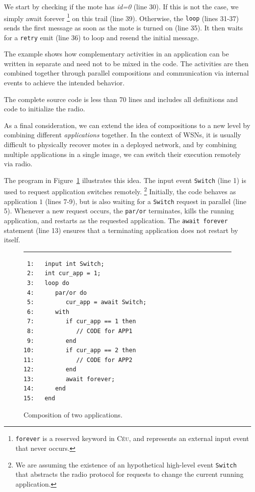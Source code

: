 \documentclass{sigplan-proc}
\newcommand{\2}{\;\;}
\newcommand{\5}{\;\;\;\;\;}
\newcommand{\CEU}{\textsc{C\'{e}u}}
\newcommand{\code}[1] {{\small{\texttt{#1}}}}
\begin{document}
We start by checking if the mote has \emph{id=0} (line 30).
If this is not the case, we simply await forever%
\footnote{\code{forever} is a reserved keyword in \CEU, and represents an 
external input event that never occurs.}
on this trail (line 39).
Otherwise, the \code{loop} (lines 31-37) sends the first message as soon as the 
mote is turned on (line 35).
It then waits for a \code{retry} emit (line 36) to loop and resend the initial 
message.

The example shows how complementary activities in an application can be written 
in separate and need not to be mixed in the code.
The activities are then combined together through parallel compositions and 
communication via internal events to achieve the intended behavior.

The complete source code is less than 70 lines and includes all definitions and 
code to initialize the radio.

As a final consideration, we can extend the idea of compositions to a new level 
by combining different \emph{applications} together.
In the context of WSNs, it is usually difficult to physically recover motes in 
a deployed network, and by combining multiple applications in a single image, 
we can switch their execution remotely via radio.

The program in Figure~\ref{lst:demos:ring:4} illustrates this idea.
The input event \code{Switch} (line 1) is used to request application switches 
remotely.%
\footnote{ We are assuming the existence of an hypothetical high-level event 
\code{Switch} that abstracts the radio protocol for requests to change the 
current running application. }
Initially, the code behaves as application $1$ (lines 7-9), but is also waiting 
for a \code{Switch} request in parallel (line 5).
Whenever a new request occurs, the \code{par/or} terminates, kills the running 
application, and restarts as the requested application.
The \code{await forever} statement (line 13) ensures that a terminating 
application does not restart by itself.

\begin{figure}[t]
\rule{8.5cm}{0.37pt}
{\small
\begin{verbatim}
 1:   input int Switch;
 2:   int cur_app = 1;
 3:   loop do
 4:      par/or do
 5:         cur_app = await Switch;
 6:      with
 7:         if cur_app == 1 then
 8:            // CODE for APP1
 9:         end
10:         if cur_app == 2 then
11:            // CODE for APP2
12:         end
13:         await forever;
14:      end
15:   end
\end{verbatim}
}
\caption{ Composition of two applications.
\label{lst:demos:ring:4}
}
\end{figure}
\end{document}
